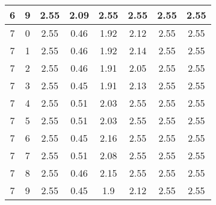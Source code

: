 \begin{longtable}{|c|c||c||c|c|c||c|c|}
	6 & 9 & 2.55 & 2.09 & 2.55 & 2.55 & 2.55 & 2.55 \\ \hline
	7 & 0 & 2.55 & 0.46 & 1.92 & 2.12 & 2.55 & 2.55 \\ \hline
	7 & 1 & 2.55 & 0.46 & 1.92 & 2.14 & 2.55 & 2.55 \\ \hline
	7 & 2 & 2.55 & 0.46 & 1.91 & 2.05 & 2.55 & 2.55 \\ \hline
	7 & 3 & 2.55 & 0.45 & 1.91 & 2.13 & 2.55 & 2.55 \\ \hline
	7 & 4 & 2.55 & 0.51 & 2.03 & 2.55 & 2.55 & 2.55 \\ \hline
	7 & 5 & 2.55 & 0.51 & 2.03 & 2.55 & 2.55 & 2.55 \\ \hline
	7 & 6 & 2.55 & 0.45 & 2.16 & 2.55 & 2.55 & 2.55 \\ \hline
	7 & 7 & 2.55 & 0.51 & 2.08 & 2.55 & 2.55 & 2.55 \\ \hline
	7 & 8 & 2.55 & 0.46 & 2.15 & 2.55 & 2.55 & 2.55 \\ \hline
	7 & 9 & 2.55 & 0.45 & 1.9 & 2.12 & 2.55 & 2.55 \\ \hline
\end{longtable}
\clearpage{}
